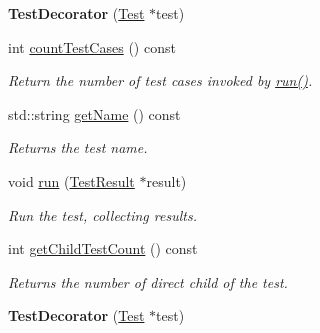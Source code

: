 \begin{DoxyCompactItemize}
\item 
\hypertarget{class_test_decorator_aa72fead52504e12f2ccccf191b0aed91}{{\bfseries Test\+Decorator} (\hyperlink{class_test}{Test} $\ast$test)}\label{class_test_decorator_aa72fead52504e12f2ccccf191b0aed91}

\item 
int \hyperlink{class_test_decorator_add3b489dfb3331eba0aee7e06b03548b}{count\+Test\+Cases} () const 
\begin{DoxyCompactList}\small\item\em Return the number of test cases invoked by \hyperlink{class_test_decorator_a64dd70aae76f31f2e2f7b5ac84a8e829}{run()}. \end{DoxyCompactList}\item 
std\+::string \hyperlink{class_test_decorator_acdcf679bba926032d2e4535fca1e9cf0}{get\+Name} () const 
\begin{DoxyCompactList}\small\item\em Returns the test name. \end{DoxyCompactList}\item 
\hypertarget{class_test_decorator_a64dd70aae76f31f2e2f7b5ac84a8e829}{void \hyperlink{class_test_decorator_a64dd70aae76f31f2e2f7b5ac84a8e829}{run} (\hyperlink{class_test_result}{Test\+Result} $\ast$result)}\label{class_test_decorator_a64dd70aae76f31f2e2f7b5ac84a8e829}

\begin{DoxyCompactList}\small\item\em Run the test, collecting results. \end{DoxyCompactList}\item 
\hypertarget{class_test_decorator_aa2fbf0467c6bd599f912415a097e087c}{int \hyperlink{class_test_decorator_aa2fbf0467c6bd599f912415a097e087c}{get\+Child\+Test\+Count} () const }\label{class_test_decorator_aa2fbf0467c6bd599f912415a097e087c}

\begin{DoxyCompactList}\small\item\em Returns the number of direct child of the test. \end{DoxyCompactList}\item 
\hypertarget{class_test_decorator_a227e67c84146b23a37b44c24877b45d9}{{\bfseries Test\+Decorator} (\hyperlink{class_test}{Test} $\ast$test)}\label{class_test_decorator_a227e67c84146b23a37b44c24877b45d9}


\end{DoxyCompactItemize}
